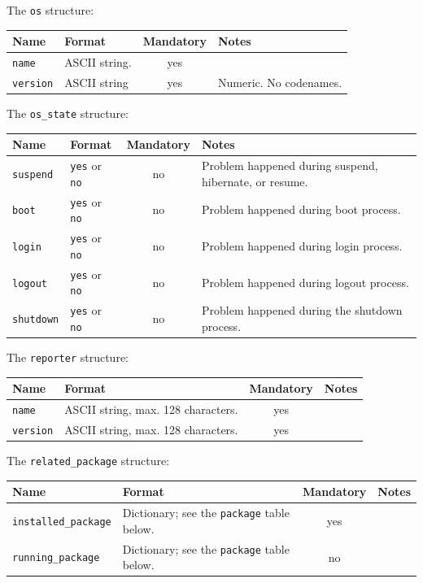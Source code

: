 \documentclass{article}
\begin{document}
The \texttt{os} structure:

\begin{flushleft}
\begin{tabular}{|l|p{5cm}|c|p{5cm}|}
\hline
Name & Format & Mandatory & Notes \\ \hline
\texttt{name} & ASCII string. & yes &  \\
\texttt{version} & ASCII string & yes & Numeric. No codenames. \\
\hline
\end{tabular}
\end{flushleft}

The \texttt{os\_state} structure:

\begin{flushleft}
\begin{tabular}{|l|p{5cm}|c|p{5cm}|}
\hline
Name & Format & Mandatory & Notes \\ \hline
\texttt{suspend} & \texttt{yes} or \texttt{no} & no & Problem happened during suspend, hibernate, or resume. \\
\texttt{boot} & \texttt{yes} or \texttt{no} & no & Problem happened during boot process. \\
\texttt{login} & \texttt{yes} or \texttt{no} & no & Problem happened during login process. \\
\texttt{logout} & \texttt{yes} or \texttt{no} & no & Problem happened during logout process. \\
\texttt{shutdown} & \texttt{yes} or \texttt{no} & no & Problem happened during the shutdown process. \\
\hline
\end{tabular}
\end{flushleft}

The \texttt{reporter} structure:

\begin{flushleft}
\begin{tabular}{|l|p{5cm}|c|p{5cm}|}
\hline
Name & Format & Mandatory & Notes \\ \hline
\texttt{name} & ASCII string, max. 128 characters. & yes & \\
\texttt{version} & ASCII string, max. 128 characters. & yes & \\
\hline
\end{tabular}
\end{flushleft}

The \texttt{related\_package} structure:

\begin{flushleft}
\begin{tabular}{|l|p{5cm}|c|p{5cm}|}
\hline
Name & Format & Mandatory & Notes \\ \hline
\texttt{installed\_package} & Dictionary; see the \texttt{package} table below. & yes & \\
\texttt{running\_package} & Dictionary; see the \texttt{package} table below. & no & \\
\hline
\end{tabular}
\end{flushleft}
\end{document}
